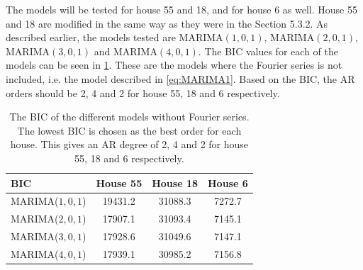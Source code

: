 \noindent The models will be tested for house 55 and 18, and for house 6 as well. House 55 and 18 are modified in the same way as they were in the Section 5.3.2. As described earlier, the models tested are MARIMA$(1,0,1)$, MARIMA$(2,0,1)$, MARIMA$(3,0,1)$ and MARIMA$(4,0,1)$. The BIC values for each of the models can be seen in \cref{tab: BIC}. These are the models where the Fourier series is not included, i.e. the model described in \cref{eq:MARIMA1}. Based on the BIC, the AR orders should be 2, 4 and 2 for house 55, 18 and 6 respectively.
\begin{table}[ht]
    \centering
    \begin{tabular}{l|ccc}
    \hline
    \textbf{BIC} & House 55 & House 18 & House 6 \\ \hline \hline
    MARIMA($1,0,1$) & 19431.2 & 31088.3 & 7272.7 \\
    MARIMA($2,0,1$) & 17907.1 & 31093.4 & 7145.1 \\
    MARIMA($3,0,1$) & 17928.6 & 31049.6 & 7147.1 \\
    MARIMA($4,0,1$) & 17939.1 & 30985.2 & 7156.8 \\
    \hline
    \end{tabular}
    \caption{The BIC of the different models without Fourier series. The lowest BIC is chosen as the best order for each house. This gives an AR degree of 2, 4 and 2 for house 55, 18 and 6 respectively.}
      \label{tab: BIC}
\end{table}

